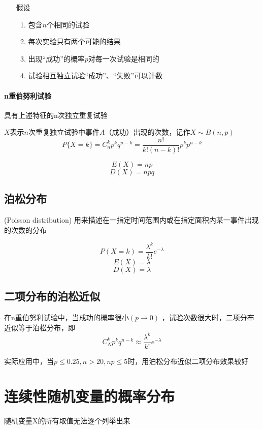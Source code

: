\documentclass[UTF8,10pt]{book}
\begin{document}
            \begin{itemize}
                \item [假设] {
                    \begin{enumerate}
                        \item 包含$n$个相同的试验
                        \item 每次实验只有两个可能的结果
                        \item 出现“成功”的概率$p$对每一次试验是相同的
                        \item 试验相互独立试验“成功”、“失败”可以计数
                    \end{enumerate}
                }
            \end{itemize}

            \paragraph{n重伯努利试验} 具有上述特征的n次独立重复试验

            $X$表示$n$次重复独立试验中事件$A$（成功）出现的次数，记作$X \sim B(n,p)$
            $$ P\{X=k\} = C_n^k p^k q^{n-k} = \frac{n!}{k!(n-k)!} p^k p^{n-k}$$

            $$ E(X) = np $$
            $$ D(X) = npq $$

        \subsection{泊松分布}
            (Poisson distribution)
            {\kaishu 用来描述在一指定时间范围内或在指定面积内某一事件出现的次数的分布}
            
            $$ P(X=k) = \frac{\lambda^k }{k!} e^{-\lambda}$$
            $$ E(X) = \lambda $$
            $$ D(X) = \lambda $$

        \subsection{二项分布的泊松近似}
            在n重伯努利试验中，当成功的概率很小$ (p\to 0)$ ，试验次数很大时，二项分布近似等于泊松分布，即
            $$ C_N^k p^k q^{n-k}  \approx   \frac{\lambda^k }{k!} e^{-\lambda}$$

            实际应用中，当$p\le 0.25 , n>20 ,np \le 5$时，用泊松分布近似二项分布效果较好




    \section{连续性随机变量的概率分布}
                {\kaishu 随机变量X的所有取值无法逐个列举出来}
\end{document}
